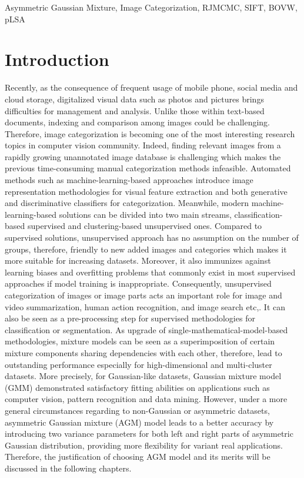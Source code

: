 \documentclass[conference]{IEEEtran}
\begin{document}
\begin{IEEEkeywords}
Asymmetric Gaussian Mixture, Image Categorization, RJMCMC, SIFT, BOVW, pLSA 
\end{IEEEkeywords}

\section{Introduction}
Recently, as the consequence of frequent usage of mobile phone, social media and cloud storage, digitalized visual data such as photos and pictures brings difficulties for management and analysis. Unlike those within text-based documents, indexing and comparison among images could be challenging. Therefore, image categorization is becoming one of the most interesting research topics in computer vision community. Indeed, finding relevant images from a rapidly growing unannotated image database is challenging which makes the previous time-consuming manual categorization methods infeasible. Automated methods such as machine-learning-based approaches \cite{Han2005} introduce image representation methodologies for visual feature extraction and both generative and discriminative classifiers for categorization. Meanwhile, modern machine-learning-based solutions can be divided into two main streams, classification-based supervised and clustering-based unsupervised ones. Compared to supervised solutions, unsupervised approach has no assumption on the number of groups, therefore, friendly to new added images and categories which makes it more suitable for increasing datasets. Moreover, it also immunizes against learning biases and overfitting problems that commonly exist in most supervised approaches if model training is inappropriate. Consequently, unsupervised categorization of images or image parts \cite{Fan2011a,Bouguila2011,Azam2015} acts an important role for image and video summarization, human action recognition, and image search etc,. It can also be seen as a pre-processing step for supervised methodologies for classification or segmentation. As upgrade of single-mathematical-model-based methodologies, mixture models \cite{Yang2015,Wen2015,Bouguila2011a} can be seen as a superimposition of certain mixture components sharing dependencies with each other, therefore, lead to outstanding performance especially for high-dimensional and multi-cluster datasets. More precisely, for Gaussian-like datasets, Gaussian mixture model (GMM)\cite{Richardson1997} demonstrated satisfactory fitting abilities on applications such as computer vision, pattern recognition and data mining. However, under a more general circumstances regarding to non-Gaussian or asymmetric datasets, asymmetric Gaussian mixture (AGM) model \cite{Elguebaly2014} leads to a better accuracy by introducing two variance parameters for both left and right parts of asymmetric Gaussian distribution, providing more flexibility for variant real applications. Therefore, the justification of choosing AGM model and its merits will be discussed in the following chapters.
\end{document}
